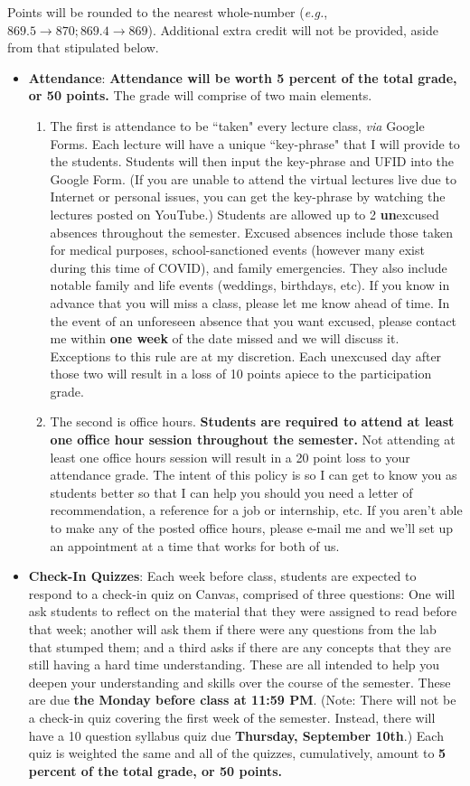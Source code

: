 \documentclass[11pt]{article}
\begin{document}
Points will be rounded to the nearest whole-number (\textit{e.g.}, $869.5 \rightarrow 870; 869.4 \rightarrow 869$). Additional extra credit will not be provided, aside from that stipulated below.
\begin{itemize}
	\item \textbf{Attendance}: \textbf{Attendance will be worth 5 percent of the total grade, or 50 points.} The grade will comprise of two main elements. 
	\begin{enumerate}
	\item The first is attendance to be ``taken" every lecture class, \textit{via} Google Forms. Each lecture will have a unique ``key-phrase" that I will provide to the students. Students will then input the key-phrase and UFID into the Google Form. (If you are unable to attend the virtual lectures live due to Internet or personal issues, you can get the key-phrase by watching the lectures posted on YouTube.) Students are allowed up to 2 \textbf{un}excused absences throughout the semester. Excused absences include those taken for medical purposes, school-sanctioned events (however many exist during this time of COVID), and family emergencies. They also include notable family and life events (weddings, birthdays, etc). If you know in advance that you will miss a class, please let me know ahead of time. In the event of an unforeseen absence that you want excused, please contact me within \textbf{one week} of the date missed and we will discuss it. Exceptions to this rule are at my discretion. Each unexcused day after those two will result in a loss of 10 points apiece to the participation grade.
	\item The second is office hours. \textbf{Students are required to attend at least one office hour session throughout the semester.} Not attending at least one office hours session will result in a 20 point loss to your attendance grade. The intent of this policy is so I can get to know you as students better so that I can help you should you need a letter of recommendation, a reference for a job or internship, etc. If you aren't able to make any of the posted office hours, please e-mail me and we'll set up an appointment at a time that works for both of us.  
	\end{enumerate}	 
	\item \textbf{Check-In Quizzes}: Each week before class, students are expected to respond to a check-in quiz on Canvas, comprised of three questions: One will ask students to reflect on the material that they were assigned to read before that week; another will ask them if there were any questions from the lab that stumped them; and a third asks if there are any concepts that they are still having a hard time understanding. These are all intended to help you deepen your understanding and skills over the course of the semester. These are due \textbf{the Monday before class at 11:59 PM}. (Note: There will not be a check-in quiz covering the first week of the semester. Instead, there  will have a 10 question syllabus quiz due \textbf{Thursday, September 10th}.) Each quiz is weighted the same and all of the quizzes, cumulatively, amount to \textbf{5 percent of the total grade, or 50 points.} 

\end{itemize}
\end{document}
